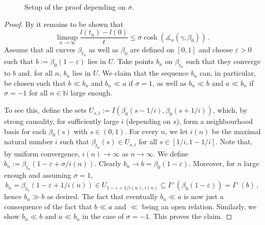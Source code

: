 \documentclass[11pt,reqno]{amsart}
\theoremstyle{definition}
\newcommand{\Cref}[1]{\zcref[S]{#1}}
\theoremstyle{definition}
\theoremstyle{plain}
\theoremstyle{remark}
\newcommand{\ma}{\measuredangle}
\begin{document}
\begin{figure}
\caption{Setup of the proof depending on $\sigma$.}
\label{fig: fvf setup}
\end{figure}

\begin{proof}
    By \Cref{prop:geq} it remains to be shown that 
    \begin{equation*}
        \limsup_{n\to\infty}\frac{l(t_n)-l(0)}{t}\leq \sigma\cosh(\ma_a(\gamma,\beta_0)) \, .
    \end{equation*}
    Assume that all curves $\beta_{t_n}$ as well as $\beta_0$ are defined on $[0,1]$ and choose $\varepsilon>0$ such that $b:=\beta_0(1-\varepsilon)$ lies in $U$. Take points $b_n$ on $\beta_{t_n}$ such that they converge to $b$ and, for all $n$, $b_n$ lies in $U$. We claim that 
    the sequence $b_n$ can, in particular, be chosen such that $b\ll b_n$ and $b_n\ll a$ if $\sigma=1$, as well as $b_n \ll b$ and $a \ll b_n$ if $\sigma=-1$ for all $n\in\mathbb N$ large enough.
    
    To see this, define the sets $U_{s,i}:=I(\beta_0(s-1/i),\beta_0(s+1/i))$, which, by strong causality, for sufficiently large $i$ (depending on $s$), form a neighbourhood basis for each $\beta_0(s)$ with $s\in(0,1)$. 
    For every $n$, we let $i(n)$ be the maximal natural number $i$ such that $\beta_{t_n}(s)\in U_{s,i}$ for all $s\in[1/i,1-1/i]$. Note that, by uniform convergence, $i(n)\to\infty$ as $n\to\infty$. We define $b_n:=\beta_{t_n}(1-\varepsilon+\sigma/i(n))$. Clearly $b_n\to b=\beta_0(1-\varepsilon)$. Moreover, for $n$ large enough and assuming $\sigma=1$, 
    \[b_n=\beta_{t_n}(1-\varepsilon+1/i(n))\in U_{1-\varepsilon+1/i(n),i(n)}\subseteq I^+(\beta_0(1-\varepsilon))=I^+(b) \, ,\]
    hence $b_n\gg b$ as desired. The fact that eventually $b_n\ll a$ is now just a consequence of the fact that $b\ll a$ and $\ll$ being an open relation. 
    Similarly, we show $b_n\ll b$ and $a\ll b_n$ in the case of $\sigma=-1$. 
    This proves the claim. 
    

\end{proof}
\end{document}
